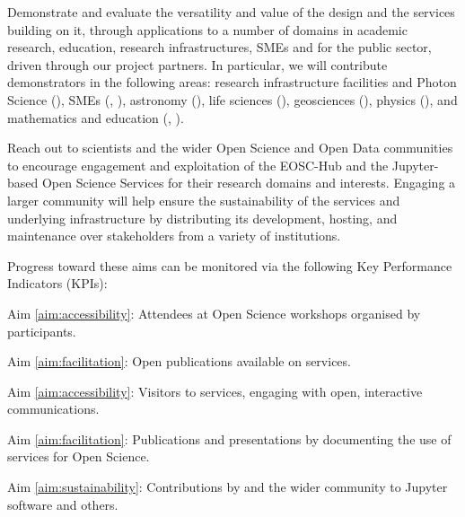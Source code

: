 \begin{compactenum}
\item \label{obj:demonstrators} %
  Demonstrate and evaluate the  versatility and value of the design and
  the services building on it, through applications to a number of
  domains in academic research, education, research infrastructures, SMEs and for
  the public sector, driven through our project partners. In
  particular, we will contribute demonstrators in the following areas: research infrastructure facilities and
  Photon Science (), SMEs (, ),
  astronomy (), life sciences (),
  geosciences (), physics (),
  and mathematics and education (, ).

\item \label{obj:outreach-and-engagement} %
  Reach out to scientists and the wider Open Science and Open Data
  communities to encourage engagement
  and exploitation of the EOSC-Hub and the Jupyter-based Open Science
  Services for their research domains and interests.
  Engaging a larger community will help ensure the sustainability of
  the services and underlying infrastructure by distributing its
  development, hosting, and maintenance over stakeholders from a
  variety of institutions.

\end{compactenum}

\noindent Progress toward these aims can be monitored via the following
Key Performance Indicators (KPIs):

\begin{compactenum}
  \item \label{kpi:workshop-attendees}
    Aim \ref{aim:accessibility}:
    Attendees at Open Science workshops organised by \TheProject participants.
  \item \label{kpi:binder-publications}
    Aim \ref{aim:facilitation}:
    Open publications available on \TheProject services.
  \item \label{kpi:binder-visits}
    Aim \ref{aim:accessibility}:
    Visitors to \TheProject services, engaging with open, interactive communications.
  \item \label{kpi:dissemination}
    Aim \ref{aim:facilitation}:
    Publications and presentations by \TheProject documenting the use of \TheProject services for Open Science.
  \item \label{kpi:contributions}
    Aim \ref{aim:sustainability}:
    Contributions by \TheProject and the wider community to Jupyter software and others.
\end{compactenum}


